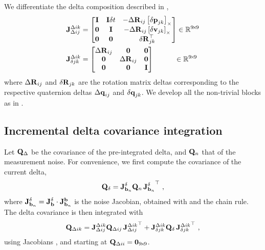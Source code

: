 We differentiate the delta composition  described in ,
%
\begin{subequations}\label{equ:jac_composition}
\begin{align}
{{\bf J}^{\Delta ik}_{\Delta ij}} &= \begin{bmatrix}
{\bf I}  & {\bf I}\delta t & - {\Delta{\bf R}}_{ij}  \left[{\delta{\bf p}}_{jk}\right]_\times  \\
\bf0  & {\bf I}    & - {\Delta{\bf R}}_{ij}  \left[{\delta{\bf v}}_{jk}\right]_\times \\
\bf0  & \bf0    &   {\delta{\bf R}}_{jk}^{\top} 
\end{bmatrix} 
\in {\mathbb R}^{9\!\times\!9}
\\
{{\bf J}^{\Delta ik}_{\delta jk}} &= \begin{bmatrix}
{\Delta{\bf R}}_{ij} & \bf0     & \bf0 \\
\bf0     & {\Delta{\bf R}}_{ij} & \bf0 \\
\bf0     & \bf0     & {\bf I}  
\end{bmatrix}
~~~~~~~~~\in {\mathbb R}^{9\!\times\!9}
\end{align}
\end{subequations}
%
where ${\Delta{\bf R}}_{ij}$ and ${\delta{\bf R}}_{jk}$ are the rotation matrix deltas corresponding to the respective quaternion deltas ${\Delta{\bf q}}_{ij}$ and ${\delta{\bf q}}_{jk}$. 
We develop all the non-trivial blocks as in .


\subsection{Incremental delta covariance integration}

Let ${\bf Q}_\Delta$ be the covariance of the pre-integrated delta, and ${\bf Q}_n$ that of the measurement noise. For convenience, we first compute the covariance of the current delta,
%
\begin{align}
{\bf Q}_\delta =  {{\bf J}^{\delta}_{{\bf b}_n}}{\bf Q}_n\,{{\bf J}^{\delta}_{{\bf b}_n}}^{\top}
~,
\end{align}
%
where ${{\bf J}^{\delta}_{{\bf b}_n}} = {{\bf J}^{\delta}_{{\bf b}}} \cdot {{\bf J}^{{\bf b}}_{{\bf b}_n}}
$ is the noise Jacobian, obtained with  and the chain rule.
The delta covariance is then integrated with
%
\begin{align}
{\bf Q}_{\Delta ik} = {{\bf J}^{\Delta ik}_{\Delta ij}}{\bf Q}_{\Delta ij}\,{{\bf J}^{\Delta ik}_{\Delta ij}}^{\top} + {{\bf J}^{\Delta ik}_{\delta jk}}{\bf Q}_\delta\,{{\bf J}^{\Delta ik}_{\delta jk}}^{\top}
~,
\end{align}
%
using Jacobians , and starting at ${\bf Q}_{\Delta ii}={\bf0}_{9\!\times\!9}$.



